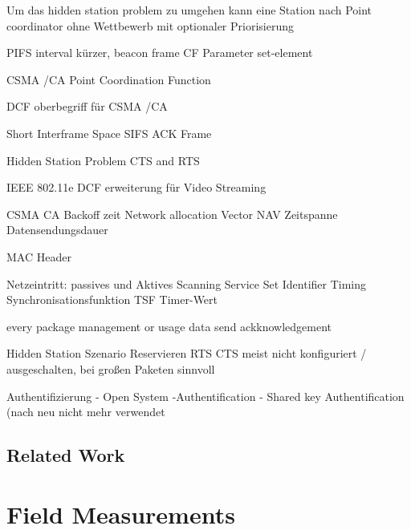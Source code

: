 \documentclass[]{nsm-thesis}
\begin{document}
Um das hidden station problem zu umgehen kann eine Station nach \textcite{sauter_wireless_2022} 
Point coordinator 
ohne Wettbewerb mit optionaler Priorisierung

PIFS interval kürzer, 
beacon frame
CF Parameter set-element

CSMA /CA
Point Coordination Function

\textcite{sauter_wireless_2022}
DCF oberbegriff für CSMA /CA
 
 
Short Interframe Space SIFS ACK Frame 
 
Hidden Station Problem 
CTS and RTS
 
IEEE 802.11e DCF erweiterung für Video Streaming

CSMA CA Backoff zeit
Network allocation Vector NAV Zeitspanne Datensendungsdauer

MAC Header

Netzeintritt:
passives und Aktives Scanning
Service Set Identifier
Timing Synchronisationsfunktion TSF Timer-Wert

\textcite{sauter_wireless_2022}
every package management or usage data send ackknowledgement

Hidden Station Szenario
Reservieren
RTS CTS
meist nicht konfiguriert / ausgeschalten, bei großen Paketen sinnvoll



Authentifizierung
- Open System -Authentification
- Shared key Authentification
(nach neu nicht mehr verwendet

\section{Related Work}





\chapter{Field Measurements}
\end{document}
